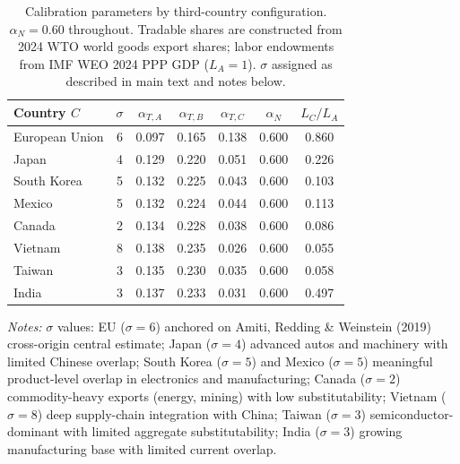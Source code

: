 \documentclass[11pt]{article}
\theoremstyle{plain}
\theoremstyle{remark}
\numberwithin{lemma}{section}
\numberwithin{proposition}{section}
\numberwithin{corollary}{section}
\begin{document}
\begin{appendix}
\begin{table}[htbp]
\centering
\caption{Calibration parameters by third-country configuration. $\alpha_N = 0.60$ throughout. Tradable shares are constructed from 2024 WTO world goods export shares; labor endowments from IMF WEO 2024 PPP GDP ($L_A = 1$). $\sigma$ assigned as described in main text and notes below.}
\label{tab:app_params}
\vspace{4pt}
\begin{tabular}{lcccccc}
\hline\hline
Country $C$ & $\sigma$ & $\alpha_{T,A}$ & $\alpha_{T,B}$ & $\alpha_{T,C}$ & $\alpha_N$ & $L_C / L_A$ \\
\hline
European Union  & 6 & 0.097 & 0.165 & 0.138 & 0.600 & 0.860 \\
Japan           & 4 & 0.129 & 0.220 & 0.051 & 0.600 & 0.226 \\
South Korea     & 5 & 0.132 & 0.225 & 0.043 & 0.600 & 0.103 \\
Mexico          & 5 & 0.132 & 0.224 & 0.044 & 0.600 & 0.113 \\
Canada          & 2 & 0.134 & 0.228 & 0.038 & 0.600 & 0.086 \\
Vietnam         & 8 & 0.138 & 0.235 & 0.026 & 0.600 & 0.055 \\
Taiwan          & 3 & 0.135 & 0.230 & 0.035 & 0.600 & 0.058 \\
India           & 3 & 0.137 & 0.233 & 0.031 & 0.600 & 0.497 \\
\hline\hline
\end{tabular}
\begin{tablenotes}
\footnotesize
\item \textit{Notes:} $\sigma$ values: EU ($\sigma=6$) anchored on Amiti, Redding \& Weinstein (2019) cross-origin central estimate; Japan ($\sigma=4$) advanced autos and machinery with limited Chinese overlap; South Korea ($\sigma=5$) and Mexico ($\sigma=5$) meaningful product-level overlap in electronics and manufacturing; Canada ($\sigma=2$) commodity-heavy exports (energy, mining) with low substitutability; Vietnam ($\sigma=8$) deep supply-chain integration with China; Taiwan ($\sigma=3$) semiconductor-dominant with limited aggregate substitutability; India ($\sigma=3$) growing manufacturing base with limited current overlap.
\end{tablenotes}
\end{table}


\end{appendix}
\end{document}
